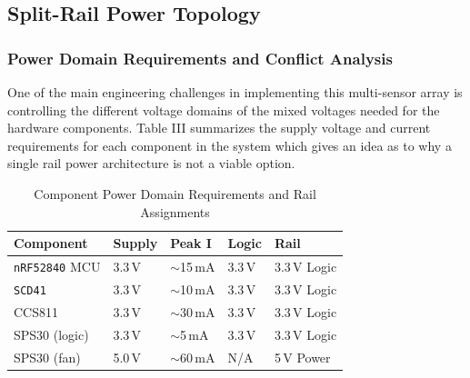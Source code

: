 \documentclass[conference]{IEEEtran}
\begin{document}



\subsection{Split-Rail Power Topology}
\subsubsection{Power Domain Requirements and Conflict Analysis}
One of the main engineering challenges in implementing this multi-sensor array is controlling the different voltage domains of the mixed voltages needed for the hardware components. Table III summarizes the supply voltage and current requirements for each component in the system which gives an idea as to why a single rail power architecture is not a viable option.

\begin{table}[htbp]
\caption{Component Power Domain Requirements and Rail Assignments}
\label{tab:power_domains}
\centering
\footnotesize
\renewcommand{\arraystretch}{1.4}
\begin{tabular}{|p{1.6cm}|p{1.0cm}|p{1.1cm}|p{1.0cm}|p{1.6cm}|}
\hline
\textbf{Component} & \textbf{Supply} & \textbf{Peak I} & \textbf{Logic} & \textbf{Rail} \\
\hline
\texttt{nRF52840} MCU  & 3.3\,V & $\sim$15\,mA & 3.3\,V & 3.3\,V Logic \\
\hline
\texttt{SCD41}        & 3.3\,V & $\sim$10\,mA & 3.3\,V & 3.3\,V Logic \\
\hline
CCS811        & 3.3\,V & $\sim$30\,mA & 3.3\,V & 3.3\,V Logic \\
\hline
SPS30 (logic) & 3.3\,V & $\sim$5\,mA  & 3.3\,V & 3.3\,V Logic \\
\hline
SPS30 (fan)   & 5.0\,V & $\sim$60\,mA & N/A    & 5\,V Power   \\
\hline
\end{tabular}
\end{table}
\end{document}
